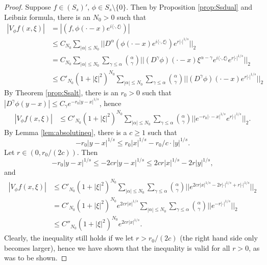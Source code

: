 \documentclass[11pt,a4paper,reqno]{amsart}
\numberwithin{equation}{section}
\theoremstyle{definition}
\theoremstyle{definition}
\begin{document}
\begin{proof}
Suppose $f\in (S_s)'$, $\phi\in S_s\setminus\{0\}$. Then by Proposition \ref{prop:Ssdual} and Leibniz formula, there is an $N_0>0$ such that
\begin{align*}
    |V_\phi f(x,\xi)| &= |(f,\phi(\cdot-x)e^{i\langle\cdot,\xi\rangle})|  \\
    &\leq C_{N_0} \sum_{|\alpha|\leq N_0} || D^\alpha \left(\phi(\cdot-x)e^{i\langle \cdot,\xi\rangle}\right) e^{r|\cdot|^{1/s}}||_2\\
    &= C_{N_0} \sum_{|\alpha|\leq N_0}\sum_{\gamma\leq\alpha}\binom{\alpha}{\gamma} || (D^\gamma \phi)(\cdot-x) \xi^{\alpha-\gamma} e^{i\langle \cdot,\xi\rangle} e^{r|\cdot|^{1/s}}||_2 \\
    &\leq C'_{N_0} (1+|\xi|^2)^{N_0} \sum_{|\alpha|\leq N_0}\sum_{\gamma\leq\alpha}\binom{\alpha}{\gamma} || (D^\gamma \phi)(\cdot-x) e^{r|\cdot|^{1/s}}||_2
\end{align*}
By Theorem \ref{prop:Ssalt}, there is an $r_0>0$ such that $|D^{\gamma}\phi(y-x)|\leq C_\gamma e^{-r_0|y-x|^{1/s}}$, hence
\begin{align*}
    |V_\phi f(x,\xi)| &\leq C'_{N_0} (1+|\xi|^2)^{N_0} \sum_{|\alpha|\leq N_0}\sum_{\gamma\leq\alpha}\binom{\alpha}{\gamma} || e^{-r_0|\cdot-x|^{1/s}} e^{r|\cdot|^{1/s}}||_2.
\end{align*}
By Lemma \ref{lem:absolutineq}, there is a $c\geq 1$ such that
\begin{equation*}
    - r_0|y-x|^{1/s} \leq   r_0 |x|^{1/s} - r_0/c \cdot |y|^{1/s}.
\end{equation*}
Let $r\in (0, r_0 /(2c))$. Then
\begin{equation*}
    - r_0|y-x|^{1/s} \leq - 2 c r|y-x|^{1/s} \leq  2 c r |x|^{1/s} - 2 r |y|^{1/s},
\end{equation*}
and
\begin{align*}
    |V_\phi f(x,\xi)| &\leq C'_{N_0} (1+|\xi|^2)^{N_0} \sum_{|\alpha|\leq N_0}\sum_{\gamma\leq\alpha}\binom{\alpha}{\gamma} || e^{2cr |x|^{1/s} - 2 r |\cdot|^{1/s} + r|\cdot|^{1/s}}||_2 \\
    &=C'_{N_0} (1+|\xi|^2)^{N_0} e^{2 c r |x|^{1/s}} \sum_{|\alpha|\leq N_0}\sum_{\gamma\leq\alpha}\binom{\alpha}{\gamma} ||  e^{-r|\cdot|^{1/s}}||_2  \\
    &\leq C''_{N_0} (1+|\xi|^2)^{N_0} e^{2 c r |x|^{1/s}}.
\end{align*}
Clearly, the inequality still holds if we let $r>r_0/(2c)$ (the right hand side only becomes larger), hence we have shown that the inequality is valid for all $r>0$, as was to be shown.


\end{proof}
\end{document}
